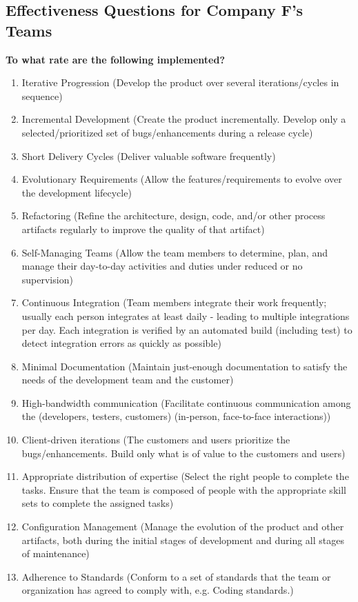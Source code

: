 \begin{appendices}
\chapter{Effectiveness Questions for Company F's Teams}
\label{sec:effectiveness_survey}

{\large \textbf{To what rate are the following implemented?}}

\begin{enumerate}
	\item Iterative Progression {\footnotesize (Develop the product over several iterations/cycles in sequence)}
	\item Incremental Development {\footnotesize (Create the product incrementally. Develop only a selected/prioritized set of bugs/enhancements during a release cycle)}
	\item Short Delivery Cycles {\footnotesize (Deliver valuable software frequently)}
	\item Evolutionary Requirements {\footnotesize (Allow the features/requirements to evolve over the development lifecycle)}
	\item Refactoring {\footnotesize (Refine the architecture, design, code, and/or other process artifacts regularly to improve the quality of that artifact)}
	\item Self-Managing Teams {\footnotesize(Allow the team members to determine, plan, and manage their day-to-day activities and duties under reduced or no supervision)}
	\item Continuous Integration {\footnotesize(Team members integrate their work frequently; usually each person integrates at least daily - leading to multiple integrations per day. Each integration is verified by an automated build (including test) to detect integration errors as quickly as possible)}
	\item Minimal Documentation {\footnotesize (Maintain just-enough documentation to satisfy the needs of the development team and the customer)}
	\item High-bandwidth communication {(Facilitate continuous communication among the (developers, testers, customers) (in-person, face-to-face interactions))}
	\item Client-driven iterations {\footnotesize (The customers and users prioritize the bugs/enhancements. Build only what is of value to the customers and users)} 
	\item Appropriate distribution of expertise {\footnotesize (Select the right people to complete the tasks. Ensure that the team is composed of people with the appropriate skill sets to complete the assigned tasks)}
	\item Configuration Management {\footnotesize (Manage the evolution of the product and other artifacts, both during the initial stages of development and during all stages of maintenance)}
	\item Adherence to Standards {\footnotesize (Conform to a set of standards that the team or organization has agreed to comply with,  e.g. Coding standards.)}	
\end{enumerate}




\end{appendices}
